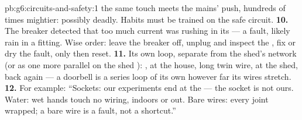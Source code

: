 \begin{solution}{pb:g6:circuits-and-safety:1}
the same touch meets the mains' push, hundreds of times mightier:
possibly deadly. Habits must be trained on the safe circuit.
\textbf{10.} The breaker detected that too much current was rushing in its
 --- a fault, likely rain in a fitting. Wise order: leave
the breaker off, unplug and inspect the , fix or dry the
fault, only then reset.
\textbf{11.} Its own loop, separate from the shed's network (or
as one more parallel  on the shed ): ,
 at the house, long twin wire,  at the shed,
back again --- a doorbell is a series loop of its own however far
its wires stretch.
\textbf{12.} For example: ``Sockets: our experiments end at the
 --- the socket is not ours. Water: wet hands touch no
wiring, indoors or out. Bare wires: every joint wrapped; a bare
wire is a fault, not a shortcut.''
\end{solution}
